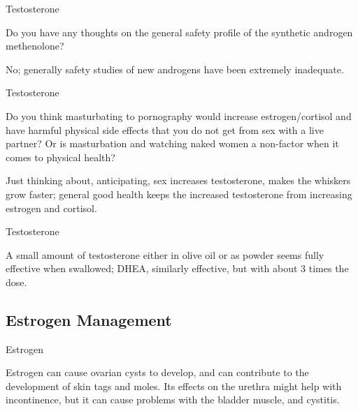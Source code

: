 \documentclass[11pt,oneside,openany,extrafontsizes]{memoir}
\begin{document}
\begin{qaexchange}{Testosterone}

    \begin{question}
        Do you have any thoughts on the general safety profile of the synthetic androgen methenolone?
    \end{question}

    \begin{answer}
      No; generally safety studies of new androgens have been extremely inadequate.
    \end{answer}
\end{qaexchange}

\begin{qaexchange}{Testosterone}

    \begin{question}
        Do you think masturbating to pornography would increase estrogen/cortisol and have harmful physical side effects that you do not get from sex with a live partner? Or is masturbation and watching naked women a non-factor when it comes to physical health?
    \end{question}

    \begin{answer}
      Just thinking about, anticipating, sex increases testosterone, makes the whiskers grow faster; general good health keeps the increased testosterone from increasing estrogen and cortisol.
    \end{answer}
\end{qaexchange}

\begin{standalonequote}{Testosterone}

    \begin{answer}
      A small amount of testosterone either in olive oil or as powder seems fully effective when swallowed; DHEA, similarly effective, but with about 3 times the dose.
    \end{answer}
\end{standalonequote}

\subsection{Estrogen Management}

\begin{standalonequote}{Estrogen}

    \begin{answer}
        Estrogen can cause ovarian cysts to develop, and can contribute to the development of skin tags and moles. Its effects on the urethra might help with incontinence, but it can cause problems with the bladder muscle, and cystitis.
    \end{answer}
\end{standalonequote}
\end{document}
